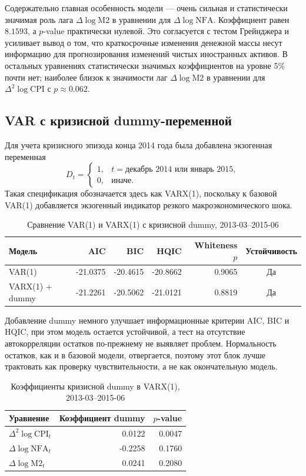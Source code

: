 \documentclass[12pt,a4paper]{article}
\begin{document}
Содержательно главная особенность модели --- очень сильная и статистически значимая роль
лага $\Delta \log \mathrm{M2}$ в уравнении для $\Delta \log \mathrm{NFA}$. Коэффициент равен $8.1593$, а
$p$-value практически нулевой. Это согласуется с тестом Грейнджера и усиливает вывод о том,
что краткосрочные изменения денежной массы несут информацию для прогнозирования изменений
чистых иностранных активов. В остальных уравнениях статистически значимых коэффициентов на
уровне 5\% почти нет; наиболее близок к значимости лаг $\Delta \log \mathrm{M2}$ в уравнении для
$\Delta^2 \log \mathrm{CPI}$ с $p \approx 0.062$.

\subsection{VAR с кризисной dummy-переменной}
Для учета кризисного эпизода конца 2014 года была добавлена экзогенная переменная
\[
D_t =
\begin{cases}
1, & t = \text{декабрь 2014 или январь 2015},\\
0, & \text{иначе}.
\end{cases}
\]
Такая спецификация обозначается здесь как VARX(1), поскольку к базовой VAR(1) добавляется
экзогенный индикатор резкого макроэкономического шока.

\begin{table}[H]
\centering
\caption{Сравнение VAR(1) и VARX(1) с кризисной dummy, 2013-03--2015-06}
\begin{tabular}{lrrrrc}
\toprule
Модель & AIC & BIC & HQIC & Whiteness $p$ & Устойчивость \\
\midrule
VAR(1) & -21.0375 & -20.4615 & -20.8662 & 0.9065 & Да \\
VARX(1) + dummy & -21.2261 & -20.5062 & -21.0121 & 0.8819 & Да \\
\bottomrule
\end{tabular}
\end{table}

Добавление dummy немного улучшает информационные критерии AIC, BIC и HQIC, при этом модель
остается устойчивой, а тест на отсутствие автокорреляции остатков по-прежнему не выявляет
проблем. Нормальность остатков, как и в базовой модели, отвергается, поэтому этот блок
лучше трактовать как проверку чувствительности, а не как окончательную модель.

\begin{table}[H]
\centering
\caption{Коэффициенты кризисной dummy в VARX(1), 2013-03--2015-06}
\begin{tabular}{lrr}
\toprule
Уравнение & Коэффициент dummy & $p$-value \\
\midrule
$\Delta^2 \log \mathrm{CPI}_t$ & 0.0122 & 0.0047 \\
$\Delta \log \mathrm{NFA}_t$ & -0.2258 & 0.1760 \\
$\Delta \log \mathrm{M2}_t$ & 0.0241 & 0.2080 \\
\bottomrule
\end{tabular}
\end{table}
\end{document}
